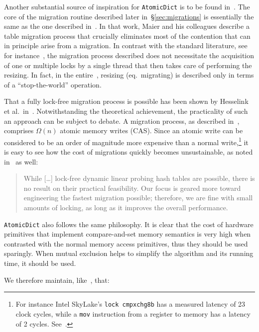 Another substantial source of inspiration for \texttt{AtomicDict} is to be found in~\cite{maier}.
The core of the migration routine described later in~\S\ref{sec:migrations} is essentially the same as the one described in~\cite[\S5.3]{maier}.
In that work, Maier and his colleagues describe a table migration process that crucially eliminates most of the contention that can in principle arise from a migration.
In contrast with the standard literature, see for instance~\cite[Figure~13.30]{art-mp}, the migration process described does not necessitate the acquisition of one or multiple locks by a single thread that then takes care of performing the resizing.
In fact, in the entire~\cite[Chapter~13]{art-mp}, resizing (eq.\ migrating) is described only in terms of a ``stop-the-world'' operation.

That a fully lock-free migration process is possible has been shown by Hesselink et al.\ in~\cite[\S3.5]{hesselink}.
Notwithstanding the theoretical achievement, the practicality of such an approach can be subject to debate.
A migration process, as described in~\cite{hesselink}, comprises $\Omega(n)$ atomic memory writes (CAS).
Since an atomic write can be considered to be an order of magnitude more expensive than a normal write,\footnote{%
	For instance Intel SkyLake's \texttt{lock cmpxchg8b} has a measured latency of 23 clock cycles, while a \texttt{mov} instruction from a register to memory has a latency of 2 cycles.
	See~\cite[Intel Ice Lake and Tiger Lake]{x86-instruction-tables}.
} it is easy to see how the cost of migrations quickly becomes unsustainable, as noted in~\cite{maier} as well:

\begin{quote}
	While [\ldots] lock-free dynamic linear probing hash tables are possible, there is no result on their practical feasibility.
	Our focus is geared more toward engineering the fastest migration possible; therefore, we are fine with small amounts of locking, as long as it improves the overall performance.
\end{quote}

\texttt{AtomicDict} also follows the same philosophy.
It is clear that the cost of hardware primitives that implement compare-and-set memory semantics is very high when contrasted with the normal memory access primitives, thus they should be used sparingly.
When mutual exclusion helps to simplify the algorithm and its running time, it should be used.

We therefore maintain, like~\cite{maier}, that:

